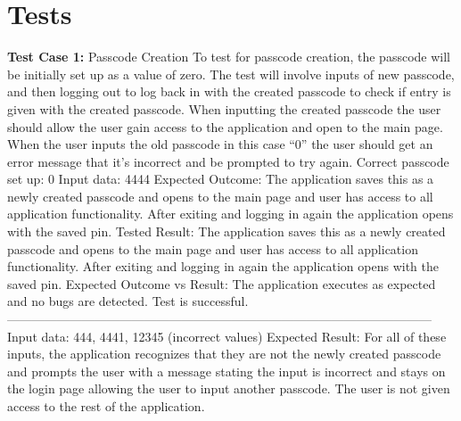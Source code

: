 \documentclass[letterpaper,12pt,titlepage]{article}
\begin{document}
\newpage
\section{Tests}
\textbf{Test Case 1:} Passcode Creation
\newline
\newline
To test for passcode creation, the passcode will be initially set up as a value of zero. The test will involve inputs of new passcode, and then logging out to log back in with the created passcode to check if entry is given with the created passcode. When inputting the created passcode the user should allow the user gain access to the application and open to the main page. When the user inputs the old passcode in this case “0” the user should get an error message that it’s incorrect and be prompted to try again.
\newline
\newline
Correct passcode set up: 0
\newline
\newline
Input data: 4444
\newline
\newline
Expected Outcome: The application saves this as a newly created passcode and opens to the main page and user has access to all application functionality. After exiting and  logging in again the application opens with the saved pin.
\newline
\newline
Tested Result: The application saves this as a newly created passcode and opens to the main page and user has access to all application functionality. After exiting and  logging in again the application opens with the saved pin.
\newline
\newline
Expected Outcome vs Result: The application executes as expected and no bugs are detected. Test is successful.
\newline
------------------------------------------------------------------------------------------------------
\newline
Input data: 444, 4441, 12345 (incorrect values)
\newline
\newline
Expected Result: For all of these inputs, the application recognizes that they are not the newly created passcode and prompts the user with a message stating the input is incorrect and stays on the login page allowing the user to input another passcode. The user is not given access to the rest of the application.
\end{document}
